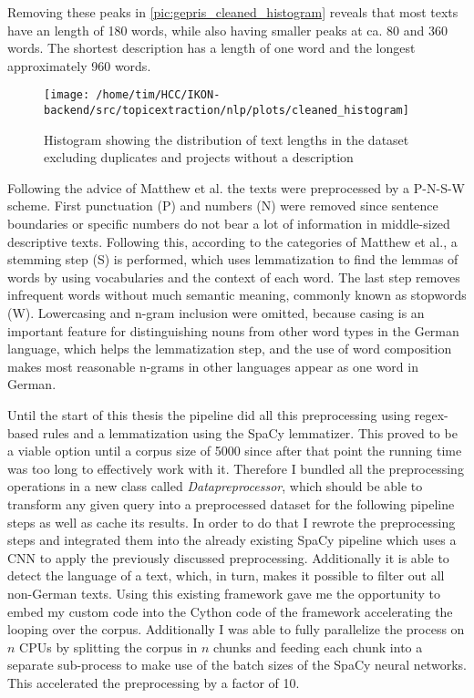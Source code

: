 Removing these peaks in \autoref{pic:gepris_cleaned_histogram} reveals that most texts have an length of 180 words, while also having smaller peaks at ca. 80 and 360 words. The shortest description has a length of one word and the longest approximately  960 words.

\begin{figure}[t]
	\centering
	\texttt{[image: /home/tim/HCC/IKON-backend/src/topicextraction/nlp/plots/cleaned\_histogram]}
	\caption{\label{pic:gepris_cleaned_histogram} Histogram showing the distribution of text lengths in the dataset excluding duplicates and projects without a description}
\end{figure}
Following the advice of Matthew et al. \cite{dennymatthewpennstateuniversity;spirlingarthurnewyorkuniversityReplicationDataText2017} the texts were preprocessed by a P-N-S-W scheme. First punctuation (P) and numbers (N) were removed since sentence boundaries or specific numbers do not bear a lot of information in middle-sized descriptive texts. Following this, according to the categories of Matthew et al., a stemming step (S) is performed, which uses lemmatization to find the lemmas of words by using vocabularies and the context of each word. The last step removes infrequent words without much semantic meaning, commonly known as stopwords (W). Lowercasing and n-gram inclusion were omitted, because casing is an important feature for distinguishing nouns from other word types in the German language, which helps the lemmatization step, and the use of word composition makes most reasonable n-grams in other languages appear as one word in German. 

Until the start of this thesis the pipeline did all this preprocessing using regex-based rules and a lemmatization using the SpaCy lemmatizer. This proved to be a viable option until a corpus size of 5000 since after that point the running time was too long to effectively work with it. Therefore I bundled all the preprocessing operations in a new class called \textit{Datapreprocessor}, which should be able to transform any given query into a preprocessed dataset for the following pipeline steps as well as cache its results. In order to do that I rewrote the preprocessing steps and integrated them into the already existing SpaCy pipeline which uses a CNN to apply the previously discussed preprocessing. Additionally it is able to detect the language of a text, which, in turn, makes it possible to filter out all non-German texts. Using this existing framework gave me the opportunity to embed my custom code into the Cython code of the framework accelerating the looping over the corpus. Additionally I was able to fully parallelize the process on $n$ CPUs by splitting the corpus in $n$ chunks and feeding each chunk into a separate sub-process to make use of the batch sizes of the SpaCy neural networks. This accelerated the preprocessing by a factor of 10.

